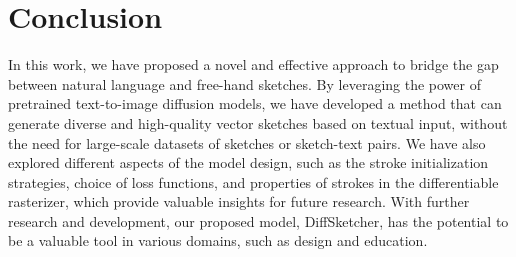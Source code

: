 \documentclass{article}
\begin{document}
\section{Conclusion}
In this work, we have proposed a novel and effective approach to bridge the gap between natural language and free-hand sketches. By leveraging the power of pretrained text-to-image diffusion models, we have developed a method that can generate diverse and high-quality vector sketches based on textual input, without the need for large-scale datasets of sketches or sketch-text pairs.
We have also explored different aspects of the model design, such as the stroke initialization strategies, choice of loss functions, and properties of strokes in the differentiable rasterizer, which provide valuable insights for future research.
With further research and development, our proposed model, DiffSketcher, has the potential to be a valuable tool in various domains, such as design and education.

\medskip

\newpage
\clearpage




\end{document}
